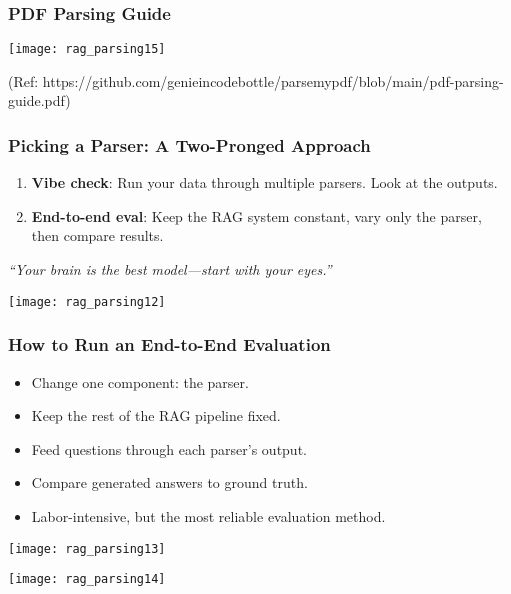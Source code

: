 \begin{frame}[fragile]\frametitle{PDF Parsing Guide}

    \begin{center}
      \texttt{[image: rag\_parsing15]}
	  
	  {\tiny (Ref: https://github.com/genieincodebottle/parsemypdf/blob/main/pdf-parsing-guide.pdf)}
    \end{center}    
\end{frame}

\begin{frame}[fragile]\frametitle{Picking a Parser: A Two-Pronged Approach}
  \begin{enumerate}
    \item \textbf{Vibe check}: Run your data through multiple parsers. Look at the outputs.
    \item \textbf{End-to-end eval}: Keep the RAG system constant, vary only the parser, then compare results.
  \end{enumerate}
  \vspace{1em}
  \textit{``Your brain is the best model—start with your eyes.''}
  
    \begin{center}
      \texttt{[image: rag\_parsing12]}
    \end{center}    
\end{frame}

\begin{frame}[fragile]\frametitle{How to Run an End-to-End Evaluation}
  \begin{itemize}
    \item Change one component: the parser.
    \item Keep the rest of the RAG pipeline fixed.
    \item Feed questions through each parser’s output.
    \item Compare generated answers to ground truth.
    \item Labor-intensive, but the most reliable evaluation method.
  \end{itemize}
  
    \begin{center}
      \texttt{[image: rag\_parsing13]}
	  
      \texttt{[image: rag\_parsing14]}
	  
    \end{center}   
\end{frame}

